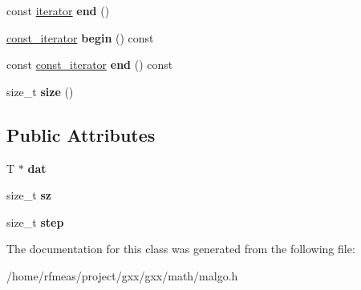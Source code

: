 \begin{DoxyCompactItemize}
\item 
const \hyperlink{structmalgo_1_1step__ptr}{iterator} {\bfseries end} ()\hypertarget{classmalgo_1_1vector__stepped__accessor_ad400a664a4da221f6141e797903f196d}{}\label{classmalgo_1_1vector__stepped__accessor_ad400a664a4da221f6141e797903f196d}

\item 
\hyperlink{structmalgo_1_1const__step__ptr}{const\+\_\+iterator} {\bfseries begin} () const \hypertarget{classmalgo_1_1vector__stepped__accessor_a9659511dc9e24d9d35fda6fa6ba1a13c}{}\label{classmalgo_1_1vector__stepped__accessor_a9659511dc9e24d9d35fda6fa6ba1a13c}

\item 
const \hyperlink{structmalgo_1_1const__step__ptr}{const\+\_\+iterator} {\bfseries end} () const \hypertarget{classmalgo_1_1vector__stepped__accessor_aa02d9cca5c9421454314da7939c830b0}{}\label{classmalgo_1_1vector__stepped__accessor_aa02d9cca5c9421454314da7939c830b0}

\item 
size\+\_\+t {\bfseries size} ()\hypertarget{classmalgo_1_1vector__stepped__accessor_af0dfe97eaf005fc8e4846fa8aa6ed9c9}{}\label{classmalgo_1_1vector__stepped__accessor_af0dfe97eaf005fc8e4846fa8aa6ed9c9}

\end{DoxyCompactItemize}
\subsection*{Public Attributes}
\begin{DoxyCompactItemize}
\item 
T $\ast$ {\bfseries dat}\hypertarget{classmalgo_1_1vector__stepped__accessor_ae0ec70600f1bb1d748fa2211f694b999}{}\label{classmalgo_1_1vector__stepped__accessor_ae0ec70600f1bb1d748fa2211f694b999}

\item 
size\+\_\+t {\bfseries sz}\hypertarget{classmalgo_1_1vector__stepped__accessor_a450bb8615e4153c3fafcb3cf42517c5b}{}\label{classmalgo_1_1vector__stepped__accessor_a450bb8615e4153c3fafcb3cf42517c5b}

\item 
size\+\_\+t {\bfseries step}\hypertarget{classmalgo_1_1vector__stepped__accessor_a07beb97a5495666f1156b21657ea89ac}{}\label{classmalgo_1_1vector__stepped__accessor_a07beb97a5495666f1156b21657ea89ac}

\end{DoxyCompactItemize}


The documentation for this class was generated from the following file\+:\begin{DoxyCompactItemize}
\item 
/home/rfmeas/project/gxx/gxx/math/malgo.\+h\end{DoxyCompactItemize}
